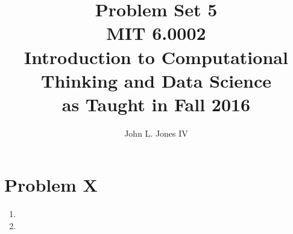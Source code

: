 \documentclass[letterpaper,11pt]{article}
\begin{document}
\title{
	\Huge{Problem Set 5}\\
	\Large{MIT 6.0002}\\
	\large{Introduction to Computational Thinking and Data Science\\
	as Taught in Fall 2016}
}
\author{
	John L. Jones IV
}
\maketitle
\pagebreak
\section*{Problem X}
\begin{enumerate}
	\item 
	\item 
\end{enumerate}

\end{document}
